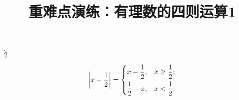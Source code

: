 \documentclass[fleqn]{article}                                       %
\title{重难点演练：有理数的四则运算1}                                              %
\date{}                                                              %
\begin{document}
\hspace{4cm}{\Large 公式}                                 %

\noindent %

$\dot{2}

$

% 

\[\left\lvert x- \frac12 \right\rvert=\begin{dcases}
x-\frac12,& x\geq \frac12;\\
\frac12-x,& x<\frac12.
\end{dcases}\]
\end{document}
